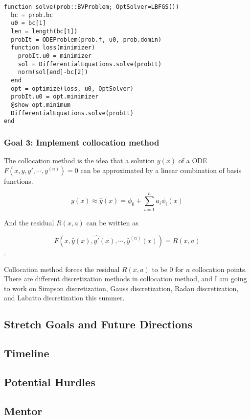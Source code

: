 \documentclass[a4paper,12pt,onecolumn]{article}
\begin{document}
\begin{lstlisting}[mathescape=true]
function solve(prob::BVProblem; OptSolver=LBFGS())
  bc = prob.bc
  u0 = bc[1]
  len = length(bc[1])
  probIt = ODEProblem(prob.f, u0, prob.domin)
  function loss(minimizer)
    probIt.u0 = minimizer
    sol = DifferentialEquations.solve(probIt)
    norm(sol[end]-bc[2])
  end
  opt = optimize(loss, u0, OptSolver)
  probIt.u0 = opt.minimizer
  @show opt.minimum
  DifferentialEquations.solve(probIt)
end
\end{lstlisting}

\subsubsection{Goal 3: Implement collocation method}
The collocation method is the idea that a solution $y(x)$ of a ODE $F(x, y, y', \cdots, y^{(n)}) = 0$
can be approximated by a linear combination of basis functions.

\[y(x) \approx \hat{y}(x) = \phi_0 + \sum_{i=1}^na_i\phi_i(x)\]

And the residual $R(x,a)$ can be written as

\[F(x, \hat{y}(x), \hat{y'}(x), \cdots, \hat{y}^{(n)}(x)) = R(x,a)\].

Collocation method forces the residual $R(x,a)$ to be $0$ for $n$ collocation points.
There are different discretization methods in collocation method, and I am going to work on
Simpson discretization, Gauss discretization, Radau discretization, and Labatto
discretization this summer.

\subsection{Stretch Goals and Future Directions}

\subsection{Timeline}

\subsection{Potential Hurdles} %
\label{sub:potential_hurdles}


\subsection{Mentor} %
\label{sub:mentor}
\end{document}
